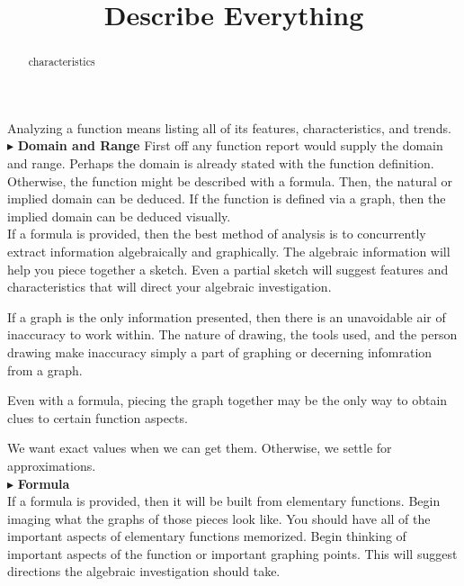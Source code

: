\documentclass{ximera}
\title{Describe Everything}
\begin{document}
\begin{abstract}
characteristics
\end{abstract}
\maketitle




Analyzing a function means listing all of its features, characteristics, and trends. \\







$\blacktriangleright$ \textbf{\textcolor{red!10!blue!90!}{Domain and Range}}   
First off any function report would supply the domain and range.  Perhaps the domain is already stated with the function definition. Otherwise, the function might be described with a formula. Then, the natural or implied domain can be deduced.  If the function is defined via a graph, then the implied domain can be deduced visually. \\

If a formula is provided, then the best method of analysis is to concurrently extract information algebraically and graphically.  The algebraic information will help you piece together a sketch.  Even a partial sketch will suggest features and characteristics that will direct your algebraic investigation.

If a graph is the only information presented, then there is an unavoidable air of inaccuracy to work within.  The nature of drawing, the tools used, and the person drawing make inaccuracy simply a part of graphing or decerning infomration from a graph.

Even with a formula, piecing the graph together may be the only way to obtain clues to certain function aspects. 

We want exact values when we can get them.  Otherwise, we settle for approximations.\\





$\blacktriangleright$ \textbf{\textcolor{red!10!blue!90!}{Formula}}  \\
If a formula is provided, then it will be built from elementary functions.  Begin imaging what the graphs of those pieces look like. You should have all of the important aspects of elementary functions memorized. Begin thinking of important aspects of the function or important graphing points. This will suggest directions the algebraic investigation should take. \\
\end{document}
